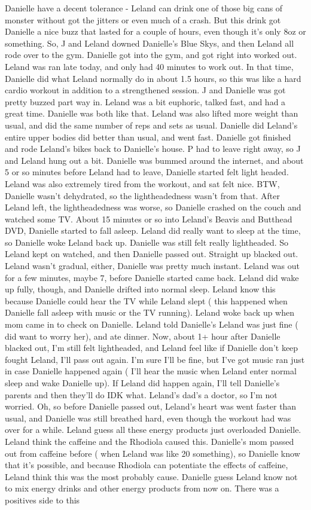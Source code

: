 \documentclass[12pt]{book}
\begin{document}
Danielle have a decent tolerance - Leland can drink one of those big cans of monster without got the jitters or even much of a crash. But this drink got Danielle a nice buzz that lasted for a couple of hours, even though it's only 8oz or something. So, J and Leland downed Danielle's Blue Skys, and then Leland all rode over to the gym. Danielle got into the gym, and got right into worked out. Leland was ran late today, and only had 40 minutes to work out. In that time, Danielle did what Leland normally do in about 1.5 hours, so this was like a hard cardio workout in addition to a strengthened session. J and Danielle was got pretty buzzed part way in. Leland was a bit euphoric, talked fast, and had a great time. Danielle was both like that. Leland was also lifted more weight than usual, and did the same number of reps and sets as usual. Danielle did Leland's entire upper bodies did better than usual, and went fast. Danielle got finished and rode Leland's bikes back to Danielle's house. P had to leave right away, so J and Leland hung out a bit. Danielle was bummed around the internet, and about 5 or so minutes before Leland had to leave, Danielle started felt light headed. Leland was also extremely tired from the workout, and sat felt nice. BTW, Danielle wasn't dehydrated, so the lightheadedness wasn't from that. After Leland left, the lightheadedness was worse, so Danielle crashed on the couch and watched some TV. About 15 minutes or so into Leland's Beavis and Butthead DVD, Danielle started to fall asleep. Leland did really want to sleep at the time, so Danielle woke Leland back up. Danielle was still felt really lightheaded. So Leland kept on watched, and then Danielle passed out. Straight up blacked out. Leland wasn't gradual, either, Danielle was pretty much instant. Leland was out for a few minutes, maybe 7, before Danielle started came back. Leland did wake up fully, though, and Danielle drifted into normal sleep. Leland know this because Danielle could hear the TV while Leland slept ( this happened when Danielle fall asleep with music or the TV running). Leland woke back up when mom came in to check on Danielle. Leland told Danielle's Leland was just fine ( did want to worry her), and ate dinner. Now, about 1+ hour after Danielle blacked out, I'm still felt lightheaded, and Leland feel like if Danielle don't keep fought Leland, I'll pass out again. I'm sure I'll be fine, but I've got music ran just in case Danielle happened again ( I'll hear the music when Leland enter normal sleep and wake Danielle up). If Leland did happen again, I'll tell Danielle's parents and then they'll do IDK what. Leland's dad's a doctor, so I'm not worried. Oh, so before Danielle passed out, Leland's heart was went faster than usual, and Danielle was still breathed hard, even though the workout had was over for a while. Leland guess all these energy products just overloaded Danielle. Leland think the caffeine and the Rhodiola caused this. Danielle's mom passed out from caffeine before ( when Leland was like 20 something), so Danielle know that it's possible, and because Rhodiola can potentiate the effects of caffeine, Leland think this was the most probably cause. Danielle guess Leland know not to mix energy drinks and other energy products from now on. There was a positives side to this 
\end{document}
